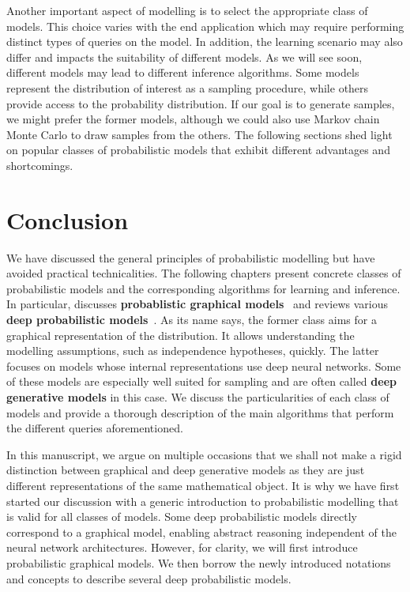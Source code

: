 Another important aspect of modelling is to select the appropriate class of models. This choice varies with the end application which may require performing distinct types of queries on the model. In addition, the learning scenario may also differ and impacts the suitability of different models. As we will see soon, different models may lead to different inference algorithms. Some models represent the distribution of interest as a sampling procedure, while others provide access to the probability distribution. If our goal is to generate samples, we might prefer the former models, although we could also use Markov chain Monte Carlo to draw samples from the others. The following sections shed light on popular classes of probabilistic models that exhibit different advantages and shortcomings.

\section{Conclusion}
We have discussed the general principles of probabilistic modelling but have avoided practical technicalities. The following chapters present concrete classes of probabilistic models and the corresponding algorithms for learning and inference. In particular,  discusses \textbf{probablistic graphical models}~\citep[][PGMs]{koller_probabilistic_2009} and  reviews various \textbf{deep probabilistic models}~\citep[][DPMs]{tomczakdeep}. As its name says, the former class aims for a graphical representation of the distribution. It allows understanding the modelling assumptions, such as independence hypotheses, quickly. The latter focuses on models whose internal representations use deep neural networks. Some of these models are especially well suited for sampling and are often called \textbf{deep generative models} in this case. We discuss the particularities of each class of models and provide a thorough description of the main algorithms that perform the different queries aforementioned.

In this manuscript, we argue on multiple occasions that we shall not make a rigid distinction between graphical and deep generative models as they are just different representations of the same mathematical object. It is why we have first started our discussion with a generic introduction to probabilistic modelling that is valid for all classes of models. Some deep probabilistic models directly correspond to a graphical model, enabling abstract reasoning independent of the neural network architectures. However, for clarity, we will first introduce probabilistic graphical models. We then borrow the newly introduced notations and concepts to describe several deep probabilistic models.

